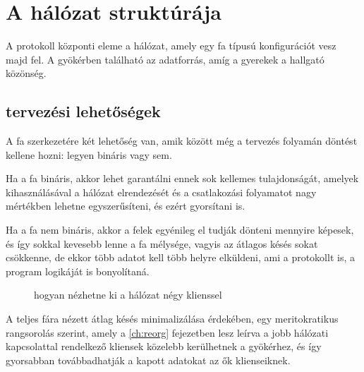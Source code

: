 \chapter{A h\'al\'ozat strukt\'ur\'aja}

A protokoll központi eleme a hálózat, amely egy fa típusú konfigurációt
vesz majd fel. A gyökérben található az adatforrás, amíg a gyerekek a
hallgató közönség.

\section{tervezési lehetőségek}
A fa szerkezetére két lehetőség van, amik között még a tervezés folyamán
döntést kellene hozni: legyen bináris vagy sem.

Ha a fa bináris, akkor lehet garantálni ennek sok kellemes tulajdonságát,
amelyek kihasználásával a hálózat elrendezését és a csatlakozási
folyamatot nagy mértékben lehetne egyszerűsíteni, és ezért gyorsítani is.

Ha a fa nem bináris, akkor a felek egyénileg el tudják dönteni mennyire
képesek, és így sokkal kevesebb lenne a fa mélysége, vagyis az átlagos
késés sokat csökkenne, de ekkor több adatot kell több helyre elküldeni,
ami a protokollt is, a program logikáját is bonyolítaná.

\begin{figure}

\caption{hogyan nézhetne ki a hálózat négy klienssel}
\end{figure}

A teljes fára nézett átlag késés minimalizálása érdekében, egy
meritokratikus rangsorolás szerint, amely a \ref{ch:reorg} fejezetben
lesz leírva a jobb hálózati kapcsolattal rendelkező kliensek közelebb
kerülhetnek a gyökérhez, és így gyorsabban továbbadhatják a kapott
adatokat az ők klienseiknek.
